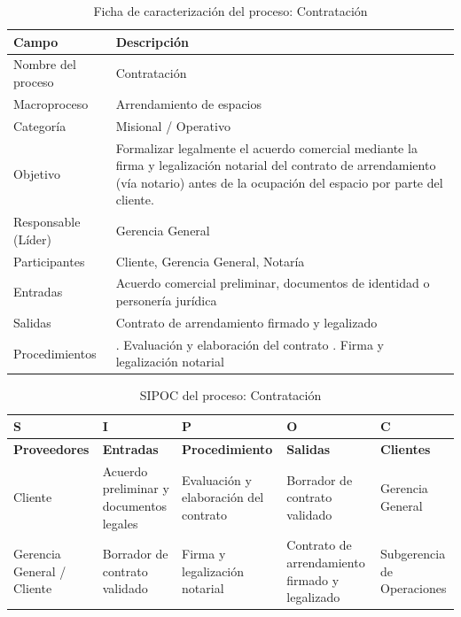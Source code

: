 \documentclass[11pt, a4paper, oneside]{report}
\begin{document}
\begin{table}[H]
\centering\small
\renewcommand{\arraystretch}{1.35}
\setlength{\tabcolsep}{6pt}
\begin{tabularx}{\textwidth}{|>{\raggedright\arraybackslash}p{}|>{\raggedright\arraybackslash}X|}
\hline
\rowcolor{upeu_dark}
\color{white}\bfseries Campo & \color{white}\bfseries Descripción \\ \hline
\rowcolor{gray!10}
Nombre del proceso & Contratación \\ \hline
Macroproceso & Arrendamiento de espacios \\ \hline
\rowcolor{gray!10}
Categoría & Misional / Operativo \\ \hline
Objetivo & Formalizar legalmente el acuerdo comercial mediante la firma y legalización notarial del contrato de arrendamiento (vía notario) antes de la ocupación del espacio por parte del cliente. \\ \hline
\rowcolor{gray!10}
Responsable (Líder) & Gerencia General \\ \hline
Participantes & Cliente, Gerencia General, Notaría \\ \hline
\rowcolor{gray!10}
Entradas & Acuerdo comercial preliminar, documentos de identidad o personería jurídica \\ \hline
Salidas & Contrato de arrendamiento firmado y legalizado \\ \hline
\rowcolor{gray!10}
Procedimientos & 1. Evaluación y elaboración del contrato \newline 2. Firma y legalización notarial \\ \hline
\end{tabularx}
\caption{Ficha de caracterización del proceso: Contratación}
\end{table}

\begin{table}[H]
\centering\small
\renewcommand{\arraystretch}{1.3}
\setlength{\tabcolsep}{4pt}
\begin{tabularx}{\textwidth}{|>{\raggedright\arraybackslash}p{}|>{\raggedright\arraybackslash}p{}|>{\raggedright\arraybackslash}p{}|>{\raggedright\arraybackslash}p{}|>{\raggedright\arraybackslash}X|}
\hline
\rowcolor{upeu_dark}
\color{white}\bfseries S & \color{white}\bfseries I & \color{white}\bfseries P & \color{white}\bfseries O & \color{white}\bfseries C \\ \hline
\rowcolor{upeu_light}
\bfseries Proveedores & \bfseries Entradas & \bfseries Procedimiento & \bfseries Salidas & \bfseries Clientes \\ \hline
Cliente &
Acuerdo preliminar y documentos legales &
Evaluación y elaboración del contrato &
Borrador de contrato validado &
Gerencia General \\ \hline
\rowcolor{gray!10}
Gerencia General / Cliente &
Borrador de contrato validado &
Firma y legalización notarial &
Contrato de arrendamiento firmado y legalizado &
Subgerencia de Operaciones \\ \hline
\end{tabularx}
\caption{SIPOC del proceso: Contratación}
\end{table}
\end{document}
